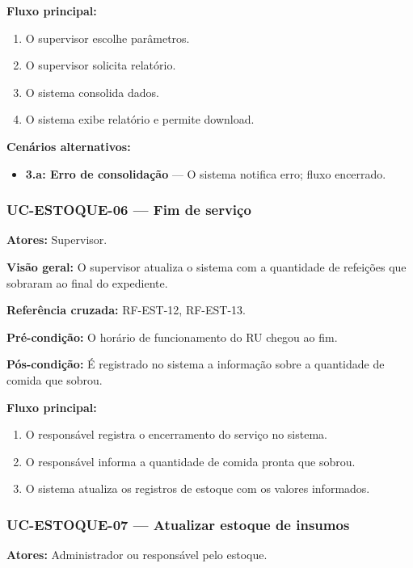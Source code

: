 \documentclass[12pt,a4paper]{article}
\begin{document}
\textbf{Fluxo principal:}
\begin{enumerate}
    \item O supervisor escolhe parâmetros.
    \item O supervisor solicita relatório.
    \item O sistema consolida dados.
    \item O sistema exibe relatório e permite download.
\end{enumerate}

\textbf{Cenários alternativos:}
\begin{itemize}
    \item \textbf{3.a: Erro de consolidação} — O sistema notifica erro; fluxo encerrado.
\end{itemize}


\subsubsection{UC-ESTOQUE-06 — Fim de serviço}
\textbf{Atores:} Supervisor.  

\textbf{Visão geral:} O supervisor atualiza o sistema com a quantidade de refeições que sobraram ao final do expediente.  

\textbf{Referência cruzada:} RF-EST-12, RF-EST-13.  

\textbf{Pré-condição:} O horário de funcionamento do RU chegou ao fim.  

\textbf{Pós-condição:} É registrado no sistema a informação sobre a quantidade de comida que sobrou.  

\textbf{Fluxo principal:}
\begin{enumerate}
    \item O responsável registra o encerramento do serviço no sistema.
    \item O responsável informa a quantidade de comida pronta que sobrou.
    \item O sistema atualiza os registros de estoque com os valores informados.
\end{enumerate}

\subsubsection{UC-ESTOQUE-07 — Atualizar estoque de insumos}
\textbf{Atores:} Administrador ou responsável pelo estoque.  
\end{document}
